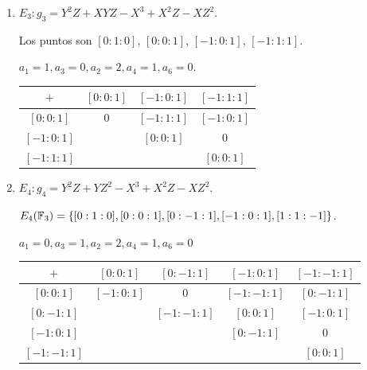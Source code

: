\documentclass[twoside]{article}
\begin{document}
\begin{solucion}
\begin{enumerate}
\item $E_3: g_3=Y^2Z + XYZ - X^3 +X^2Z - XZ^2$.

Los puntos son $[0:1:0]$, $[0:0:1]$, $[-1:0:1]$, $[-1:1:1]$.

$a_1=1,a_3=0, a_2=2, a_4=1,a_6=0$.

\begin{tabular}{|c||c|c|c|}
\hline
$+$ & $[0:0:1]$ & $[-1:0:1]$  & $[-1:1:1]$ \\
\hline
\hline
$[0:0:1]$ &   0  &     $[-1:1:1]$      &    $[-1:0:1]$     \\
\hline
$[-1:0:1]$  &      &      $[0:0:1]$  &     0  \\
\hline
$[-1:1:1]$ &       &         &     $[0:0:1]$     \\
\hline
\end{tabular}

\item $E_4: g_4=Y^2Z + YZ^2 - X^3 + X^2Z - XZ^2$.

$E_4(\mathbb{F}_3)=\{[0:1:0], [0:0:1], [0:-1:1], [-1:0:1], [1:1:-1]\}$. 

$a_1=0,a_3=1,a_2=2,a_4=1,a_6=0$

\begin{tabular}{|c||c|c|c|c|}
\hline
$+$ & $[0:0:1]$ & $[0:-1:1]$  & $[-1:0:1]$ & $[-1:-1:1]$ \\
\hline
\hline
$[0:0:1]$ &  $[-1:0:1]$   &     0      &  $[-1:-1:1]$  &  $[0:-1:1]$   \\
\hline
$[0:-1:1]$  &      &  $[-1:-1:1]$     &  $[0:0:1]$   &  $[-1:0:1]$\\
\hline
$[-1:0:1]$ &        &     & $[0:-1:1]$     & 0\\
\hline 
$[-1:-1:1]$ &       &         &     &    $[0:0:1]$ \\
\hline
\end{tabular}
\end{enumerate}

\end{solucion}
\end{document}

